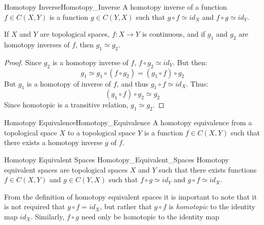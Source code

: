 \documentclass{article}                                                        %
\begin{document}
        \begin{ldefinition}{Homotopy Inverse}{Homotopy_Inverse}
            A homotopy inverse of a function $f\in{C}(X,Y)$ is a function
            $g\in{C}(Y,X)$ such that $g\circ{f}\simeq{id}_{X}$ and
            $f\circ{g}\simeq{id}_{Y}$.
        \end{ldefinition}
        \begin{theorem}
            If $X$ and $Y$ are topological spaces, $f:X\rightarrow{Y}$ is
            continuous, and if $g_{1}$ and $g_{2}$ are homotopy inverses
            of $f$, then $g_{1}\simeq{g}_{2}$.
        \end{theorem}
        \begin{proof}
            Since $g_{2}$ is a homotopy inverse of $f$,
            $f\circ{g}_{2}\simeq{id}_{Y}$. But then:
            \begin{equation}
                g_{1}\simeq{g}_{1}\circ(f\circ{g}_{2})
                =(g_{1}\circ{f})\circ{g}_{2}
            \end{equation}
            But $g_{1}$ is a homotopy of inverse of $f$,
            and thus $g_{1}\circ{f}\simeq{id}_{X}$. Thus:
            \begin{equation}
                (g_{1}\circ{f})\circ{g}_{2}\simeq{g}_{2}
            \end{equation}
            Since homotopic is a transitive relation, $g_{1}\simeq{g}_{2}$.
        \end{proof}
        \begin{ldefinition}{Homotopy Equivalence}{Homotopy_Equivalence}
            A homotopy equivalence from a topological space $X$ to a
            topological space $Y$ is a function $f\in{C}(X,Y)$ such that
            there exists a homotopy inverse $g$ of $f$.
        \end{ldefinition}
        \begin{ldefinition}{Homotopy Equivalent Spaces}
                           {Homotopy_Equivalent_Spaces}
            Homotopy equivalent spaces are topological spaces $X$ and $Y$
            such that there exists functions ${f}\in{C(X,Y)}$ and
            ${g}\in{C(Y,X)}$ such that ${f}\circ{g}\simeq{id_{Y}}$
            and ${g}\circ{f}\simeq{id_{X}}$.
        \end{ldefinition}
        From the definition of homotopy equivalent spaces it is important
        to note that it is not required that $g\circ{f}=id_{X}$, but rather
        that $g\circ{f}$ is \textit{homotopic} to the identity map $id_{X}$.
        Similarly, $f\circ{g}$ need only be homotopic to the identity map
\end{document}
